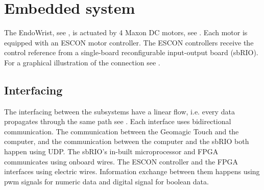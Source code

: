 \section{Embedded system}\label{sec:electronics}

The EndoWrist, see , is actuated by 4 Maxon DC motors, see . Each motor is equipped with an ESCON motor controller. The ESCON controllers receive the control reference from a single-board reconfigurable input-output board (sbRIO).   For a graphical illustration of the connection see .

\subsection{Interfacing}
The interfacing between the subsystems have a linear flow, i.e. every data propagates through the same path see . Each interface uses bidirectional communication. The communication between the Geomagic Touch and the computer, and the communication between the computer and the sbRIO both happen using UDP. The sbRIO's in-built microprocessor and FPGA communicates using onboard wires. The ESCON controller and the FPGA interfaces using electric wires. Information exchange between them happens using pwm signals for numeric data and digital signal for boolean data.





%
